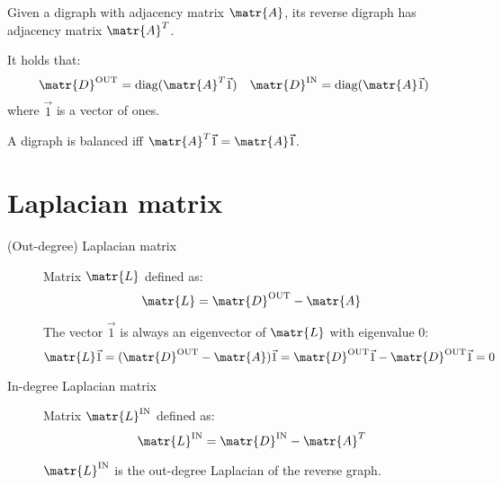 \begin{description}
        \begin{remark}
            Given a digraph with adjacency matrix $\matr{A}$, its reverse digraph has adjacency matrix $\matr{A}^T$.
        \end{remark}

        \begin{remark}
            It holds that:
            \[ 
                \matr{D}^\text{OUT} = \text{diag}(\matr{A}^T \vec{1}) 
                \quad
                \matr{D}^\text{IN} = \text{diag}(\matr{A} \vec{1})
            \]
            where $\vec{1}$ is a vector of ones.
        \end{remark}

        \begin{remark}
            A digraph is balanced iff $\matr{A}^T \vec{1} = \matr{A} \vec{1}$.
        \end{remark}
\end{description}



\section{Laplacian matrix}

\begin{description}
    \item[(Out-degree) Laplacian matrix] 
        Matrix $\matr{L}$ defined as:
        \[ \matr{L} = \matr{D}^\text{OUT} - \matr{A} \]

        \begin{remark}
            The vector $\vec{1}$ is always an eigenvector of $\matr{L}$ with eigenvalue $0$:
            \[ \matr{L}\vec{1} = (\matr{D}^\text{OUT} - \matr{A})\vec{1} = \matr{D}^\text{OUT}\vec{1} - \matr{D}^\text{OUT}\vec{1} = 0 \]
        \end{remark}

    \item[In-degree Laplacian matrix] 
        Matrix $\matr{L}^\text{IN}$ defined as:
        \[ \matr{L}^\text{IN} = \matr{D}^\text{IN} - \matr{A}^T \]

        \begin{remark}
            $\matr{L}^\text{IN}$ is the out-degree Laplacian of the reverse graph.    
        \end{remark}
\end{description}
